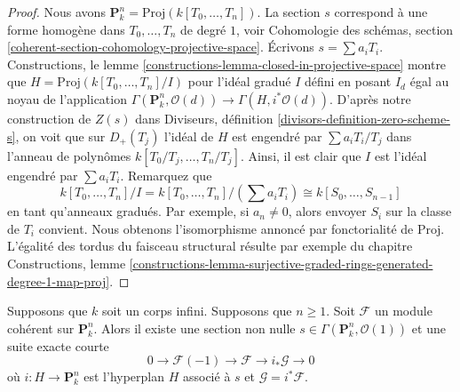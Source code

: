 \begin{proof}
Nous avons $\mathbf{P}^n_k = \text{Proj}(k[T_0,
\ldots, T_n])$. La section $s$ correspond à une
forme homogène dans $T_0, \ldots, T_n$ de degré
$1$, voir Cohomologie des schémas, section
\ref{coherent-section-cohomology-projective-space}.
Écrivons $s = \sum a_i T_i$. Constructions, le lemme
\ref{constructions-lemma-closed-in-projective-space}
montre que $H = \text{Proj}(k[T_0, \ldots, T_n]/I)$
pour l'idéal gradué $I$ défini en posant $I_d$ égal
au noyau de l'application $\Gamma(\mathbf{P}^n_k,
\mathcal{O}(d)) \to \Gamma(H, i^*\mathcal{O}(d))$.
D'après notre construction de $Z(s)$ dans Diviseurs,
définition \ref{divisors-definition-zero-scheme-s},
on voit que sur $D_{+}(T_j)$ l'idéal de $H$ est
engendré par $\sum a_i T_i/T_j$ dans l'anneau de polynômes
$k[T_0/T_j, \ldots, T_n/T_j]$. Ainsi, il est clair que
$I$ est l'idéal engendré par $\sum a_i T_i$. Remarquez que
$$
k[T_0, \ldots, T_n]/I = k[T_0, \ldots, T_n]/(\sum a_i T_i) \cong
k[S_0, \ldots, S_{n - 1}]
$$
en tant qu'anneaux gradués. Par exemple, si $a_n \not = 0$,
alors envoyer $S_i$ sur la classe de $T_i$ convient.
Nous obtenons l'isomorphisme annoncé par fonctorialité de
$\text{Proj}$. L'égalité des tordus du faisceau structural
résulte par exemple du chapitre Constructions, lemme
\ref{constructions-lemma-surjective-graded-rings-generated-degree-1-map-proj}.
\end{proof}

\begin{lemma}
\label{lemma-exact-sequence-induction}
Supposons que $k$ soit un corps infini.
Supposons que $n \geq 1$. Soit $\mathcal{F}$ un
module cohérent sur $\mathbf{P}^n_k$. Alors il
existe une section non nulle $s \in
\Gamma(\mathbf{P}^n_k, \mathcal{O}(1))$ et une suite exacte courte
$$
0 \to \mathcal{F}(-1) \to \mathcal{F} \to i_*\mathcal{G} \to 0
$$
où $i : H \to \mathbf{P}^n_k$ est l'hyperplan $H$
associé à $s$ et $\mathcal{G} = i^*\mathcal{F}$.
\end{lemma}


